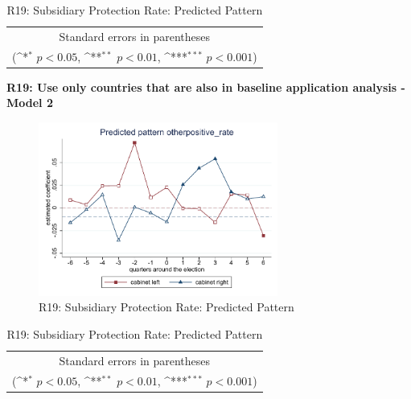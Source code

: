 \documentclass[10pt,a4paper]{scrartcl}
\begin{document}
\begin{table}[!ht]\centering
	\renewcommand{\arraystretch}{1.25}
	\def\sym#1{\ifmmode^{#1}\else\(^{#1}\)\fi}
	\caption{R19: Subsidiary Protection Rate: Predicted Pattern}
	\begin{tabular}{l*{2}{c}}
		\hline\hline
		
		\hline\hline
		\multicolumn{3}{c}{\footnotesize Standard errors in parentheses} \\
		\multicolumn{3}{c}{\footnotesize (\sym{*} \(p<0.05\), \sym{**} \(p<0.01\), \sym{***} \(p<0.001\))}\\
	\end{tabular}
\end{table}

\clearpage
\textbf{R19: Use only countries that are also in baseline application analysis - Model 2}
\begin{figure}[!ht]
	\centering
	\includegraphics[width=0.7\textwidth]{figures_edited/otherpositive_rate_graph2_R19.pdf}
	\caption{R19: Subsidiary Protection Rate: Predicted Pattern}
\end{figure}

\begin{table}[!ht]\centering
	\footnotesize
	\renewcommand{\arraystretch}{1.2}
	\def\sym#1{\ifmmode^{#1}\else\(^{#1}\)\fi}
	\caption{R19: Subsidiary Protection Rate: Predicted Pattern}
	\begin{tabular}{l*{2}{c}}
		\hline\hline
		
		\hline\hline
		\multicolumn{3}{c}{\footnotesize Standard errors in parentheses} \\
		\multicolumn{3}{c}{\footnotesize (\sym{*} \(p<0.05\), \sym{**} \(p<0.01\), \sym{***} \(p<0.001\))} \\
	\end{tabular}
\end{table}
\end{document}
